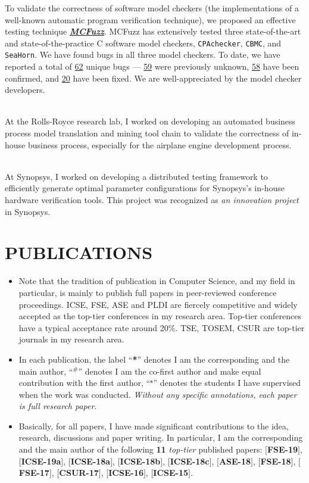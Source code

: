 \documentclass[margin]{res}
\begin{document}
\begin{resume}
To validate the correctness of software model checkers (the implementations of a well-known automatic program verification technique), we proposed an effective testing technique \textbf{\emph{\href{https://github.com/MCFuzzer/MCFuzz}{MCFuzz}}}. MCFuzz has extensively tested three state-of-the-art and state-of-the-practice C software model checkers, \texttt{CPAchecker}, \texttt{CBMC}, and \texttt{SeaHorn}. We have found bugs in all
three model checkers. To date, we have reported a total of \underline{62} unique bugs --- \underline{59} were previously unknown, \underline{58} have been confirmed, and \underline{20} have been fixed. We are well-appreciated by the model checker developers.

\\
At the Rolls-Royce research lab, I worked on developing an automated business process model translation and mining tool chain to validate the correctness of in-house business process, especially for the airplane engine development process.  

\\
At Synopsys, I worked on developing a distributed testing framework to efficiently generate optimal parameter configurations for Synopsys's in-house hardware verification tools. This project was recognized as \emph{an innovation project} in Synopsys.

\section{PUBLICATIONS}
\begin{itemize}[leftmargin=*]
    \item Note that the tradition of publication in Computer Science, and my field in particular, is mainly
to publish full papers in peer-reviewed conference proceedings. ICSE, FSE, ASE and PLDI are fiercely competitive and widely accepted as the top-tier conferences in my research area. Top-tier conferences have a typical acceptance rate around 20\%. TSE, TOSEM, CSUR are top-tier journals in my research area.
    \item In each publication, the label ``\textbf{*}'' denotes I am the corresponding and the main author, ``$^{\textbf{\#}}$'' denotes I am the co-first author and make equal contribution with the first author,  ``$^{\textbf{s}}$'' denotes the students I have supervised when the work was conducted. \emph{Without any specific annotations, each paper is full research paper}.
    \item Basically, for all papers, I have made significant contributions to the idea, research, discussions and paper writing. In particular, I am the corresponding and the main author of the following \textbf{11} \emph{top-tier} published papers: $[$\textbf{FSE-19}$]$, $[$\textbf{ICSE-19a}$]$, $[$\textbf{ICSE-18a}$]$, $[$\textbf{ICSE-18b}$]$, $[$\textbf{ICSE-18c}$]$, $[$\textbf{ASE-18}$]$, $[$\textbf{FSE-18}$]$, $[$\textbf{FSE-17}$]$, $[$\textbf{CSUR-17}$]$, $[$\textbf{ICSE-16}$]$, $[$\textbf{ICSE-15}$]$.
\end{itemize}


\end{resume}
\end{document}

